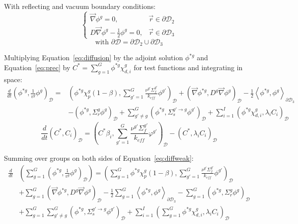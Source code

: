 \documentclass[11pt]{tamurmemo}
\newcommand{\grad}{\vec{\nabla}}
\newcommand{\be}{\begin{equation}}
\newcommand{\ee}{\end{equation}}
\newcommand{\kef}{\ensuremath{k_{\textit{eff}}}}
\newcommand{\keff}{\kef\xspace}
\newcommand{\vr}{\vec{r}}
\newcommand{\D}{\ensuremath{\mathcal{D}}}
\begin{document}
With reflecting and vacuum boundary conditions:
\be 
\begin{cases} 
\grad\phi^g = 0, &\vr\in\partial\D_2 \\ D\grad\phi^g-\frac{1}{2}\phi^g = 0, &\vr\in\partial\D_3
\end{cases}
\ee
\be 
\text{with } \partial\D=\partial\D_2\cup\partial\D_3 \nonumber
\ee

Multiplying Equation~\ref{eq:diffusion} by the adjoint solution $\phi^{*g}$ and Equation~\ref{eq:prec} by $C^*=\sum_{g=1}^G\phi^{*g} \chi_{d,i}^g$ for test functions and integrating in space:
\begin{align}
\frac{d}{dt}\left(\phi^{*g},\frac{1}{v^g}\phi^g\right)_\D =& \left(\phi^{*g}\chi_p^g(1-\beta),\sum_{g'=1}^G \frac{\nu^{g'} \Sigma_f^{g'}}{\keff} \phi^{g'}\right)_\D + \left(\grad \phi^{*g},D^g \grad \phi^g\right)_\D - \frac{1}{2}\left\langle\phi^{*g},\phi^{g}\right\rangle_{\partial \D_3} \nonumber \\
& - \left(\phi^{*g},\Sigma_r^g\phi^g\right)_\D + \sum_{g'\neq g}^G\left(\phi^{*g},\Sigma_s^{g'\to g} \phi^{g'}\right)_\D + \sum_{i=1}^I \left(\phi^{*g}\chi_{d,i}^g,\lambda_i C_i\right)_\D
\label{eq:diffweak}
\end{align}
\be
\frac{d}{dt}\left(C^*,C_i\right)_\D = \left(C^* \beta_i,\sum_{g'=1}^G\frac{\nu^{g'} \Sigma_f^{g'}}{\keff}\varphi^{g'}\right)_\D -\left(C^*,\lambda_i C_i\right)_\D
\ee

Summing over groups on both sides of Equation~\ref{eq:diffweak}:
\begin{align}
\frac{d}{dt}&\left(\sum_{g=1}^G\left(\phi^{*g},\frac{1}{v^g}\phi^g\right)_\D\right) = \left(\sum_{g=1}^G\phi^{*g}\chi_p^g(1-\beta),\sum_{g'=1}^G \frac{\nu^{g'} \Sigma_f^{g'}}{\keff} \phi^{g'}\right)_\D  \nonumber \\ 
& + \sum_{g=1}^G\left(\grad \phi^{*g},D^g \grad \phi^g\right)_\D - \frac{1}{2}\sum_{g=1}^G\left\langle\phi^{*g},\phi^{g}\right\rangle_{\partial \D_3} - \sum_{g=1}^G\left(\phi^{*g},\Sigma_r^g\phi^g\right)_\D  \nonumber \\ 
&+ \sum_{g=1}^G\sum_{g'\neq g}^G\left(\phi^{*g},\Sigma_s^{g'\to g} \phi^{g'}\right)_\D + \sum_{i=1}^I \left(\sum_{g=1}^G\phi^{*g}\chi_{d,i}^g,\lambda_i C_i\right)_\D 
\end{align}
\end{document}
